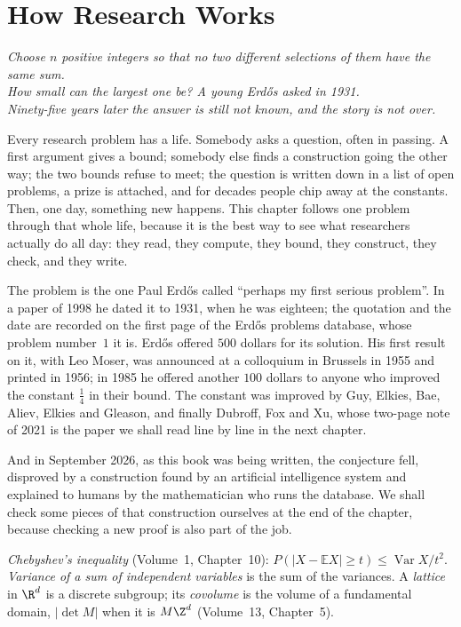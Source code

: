 \chapter{How Research Works}
\label{ch:research}

\begin{center}\itshape
Choose $n$ positive integers so that no two different selections of them have the same sum.\\
How small can the largest one be? A young Erd\H os asked in 1931.\\
Ninety-five years later the answer is still not known, and the story is not over.
\end{center}

Every research problem has a life. Somebody asks a question, often in passing. A first argument gives a bound; somebody else
finds a construction going the other way; the two bounds refuse to meet; the question is written down in a list of open
problems, a prize is attached, and for decades people chip away at the constants. Then, one day, something new happens. This
chapter follows one problem through that whole life, because it is the best way to see what researchers actually do all day:
they read, they compute, they bound, they construct, they check, and they write.

The problem is the one Paul Erd\H os called ``perhaps my first serious problem''. In a paper of 1998 he dated it to
1931, when he was eighteen; the quotation and the date are recorded on the first page of the Erd\H os problems database, whose
problem number~$1$ it is. Erd\H os offered $500$ dollars for its solution. His first result on it, with Leo Moser, was announced at
a colloquium in Brussels in 1955 and printed in 1956; in 1985 he offered another $100$ dollars to anyone who improved the constant
$\frac14$ in their bound. The constant was improved by Guy, Elkies, Bae, Aliev, Elkies and Gleason, and finally Dubroff, Fox and
Xu, whose two-page note of 2021 is the paper we shall read line by line in the next chapter.

And in September 2026, as this book was being written, the conjecture fell, disproved by a construction found by an
artificial intelligence system and explained to humans by the mathematician who runs the database. We shall check some pieces of
that construction ourselves at the end of the chapter, because checking a new proof is also part of the job.

\begin{reminder}
\emph{Chebyshev's inequality} (Volume~1, Chapter~10): $P(|X-\mathbb EX|\ge t)\le\operatorname{Var}X/t^2$. \emph{Variance of a sum of independent
variables} is the sum of the variances. A \emph{lattice} in $\R^d$ is a discrete subgroup; its \emph{covolume} is the volume of a fundamental domain,
$|\det M|$ when it is $M\Z^d$ (Volume~13, Chapter~5).
\end{reminder}

